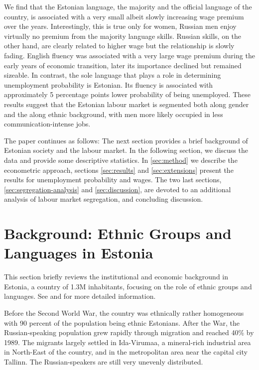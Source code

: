 \documentclass[12pt, a4paper]{article}
\begin{document}
We find that the Estonian language, the majority and the official
language of the country, is associated with a very
small albeit slowly increasing wage premium over
the years. Interestingly, this is true only for women, Russian men enjoy
virtually no premium from the majority language skills.
Russian skills, on the other hand, are clearly related to
higher wage but the relationship is slowly fading. English fluency was
associated with a very large wage premium during the early years of
economic transition, later its importance
declined but remained sizeable. 
In contrast, the sole language that plays a role in determining
unemployment probability is Estonian. Its fluency is associated with 
approximately 5 percentage points lower probability of being unemployed.
These results suggest that the Estonian labour market is 
segmented both along gender and the along ethnic background, with men
more likely occupied in less communication-intense jobs.


The paper continues as follows: The next section provides a brief
background of Estonian society and the labour market. In the following
section, we discuss the data and provide some descriptive
statistics. In \cref{sec:method} we describe the econometric
approach, sections \ref{sec:results} and \ref{sec:extensions} present
the results for unemployment probability and wages. The two last
sections, \ref{sec:segregation-analysis} and \ref{sec:discussion}, are
devoted to an additional analysis of labour market segregation, and
concluding discussion.


\section{Background: Ethnic Groups and Languages in Estonia}
\label{sec:hist_background}

This section briefly reviews the institutional and economic background
in Estonia, a country of 1.3M inhabitants,
focusing on the role of ethnic groups and languages.
See \citet{Leping2008} and
\citet{lindemann+saar2011Russian2ndGeneration} for more detailed information.

Before the Second World War, the country was ethnically rather
homogeneous with 90 percent of the population being ethnic Estonians. After the War,
the Russian-speaking population grew rapidly through migration and
reached 40\% by 1989. The migrants largely settled in Ida-Virumaa, a
mineral-rich industrial area in North-East of the country, and in the
metropolitan area near the capital city Tallinn. The
Russian-speakers are still very unevenly distributed.
\end{document}
